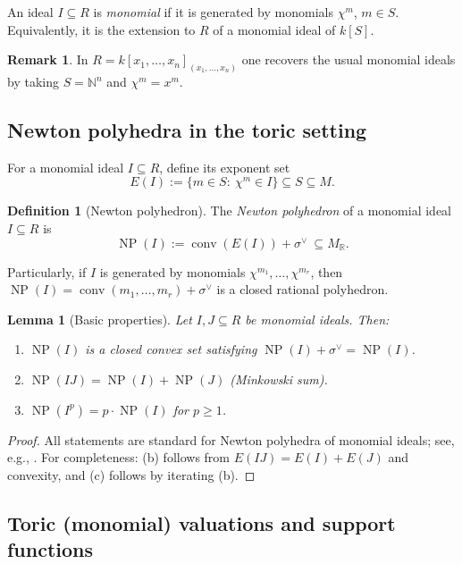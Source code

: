 \documentclass[12pt]{amsart}
\newcommand{\kk}{k}
\newcommand{\NN}{\mathbb{N}}
\newcommand{\RR}{\mathbb{R}}
\DeclareMathOperator{\conv}{conv}
\DeclareMathOperator{\NP}{NP}
\theoremstyle{plain}
\newtheorem{lemma}[theorem]{Lemma}
\theoremstyle{definition}
\newtheorem{definition}[theorem]{Definition}
\newtheorem{remark}[theorem]{Remark}
\numberwithin{equation}{section}
\begin{document}
An ideal $I\subseteq R$ is \emph{monomial} if it is generated by monomials $\chi^m$,
$m\in S$. Equivalently, it is the extension to $R$ of a monomial ideal of $\kk[S]$.


\begin{remark}
	In $R=\kk[x_1,\dots,x_n]_{(x_1,\dots,x_n)}$ one recovers the usual monomial ideals
	by taking $S=\NN^n$ and $\chi^m=x^m$.
\end{remark}

\subsection{Newton polyhedra in the toric setting}

For a monomial ideal $I\subseteq R$, define its exponent set
\[
E(I):=\{m\in S:\ \chi^m\in I\}\subseteq S\subseteq M.
\]

\begin{definition}[Newton polyhedron]\label{def:NP-toric}
	The \emph{Newton polyhedron} of a monomial ideal $I\subseteq R$ is
	\[
	\NP(I):=\conv(E(I))+\sigma^\vee\ \subseteq  M_\RR.
	\]
\end{definition}
Particularly, if $I$ is generated by monomials $\chi^{m_1}, \dots, \chi^{m_r}$, then $\NP(I) = \conv(m_1, \dots, m_r) + \sigma^\vee$ is a closed rational polyhedron.

\begin{lemma}[Basic properties] \label{lem:NP-basic}
	Let $I,J\subseteq R$ be monomial ideals. Then:
	\begin{enumerate}[label=(\alph*),leftmargin=2em]
		\item $\NP(I)$ is a closed convex set satisfying $\NP(I)+\sigma^\vee=\NP(I)$.
		\item $\NP(IJ)=\NP(I)+\NP(J)$ (Minkowski sum).
		\item $\NP(I^p)=p \cdot \NP(I)$ for $p\ge 1$.
	\end{enumerate}
\end{lemma}

\begin{proof}
	All statements are standard for Newton polyhedra of monomial ideals; see, e.g., \cite{Sturmfels,TeissierNP}.
	For completeness: (b) follows from $E(IJ)=E(I)+E(J)$ and convexity, and (c) follows by iterating (b).
\end{proof}

\subsection{Toric (monomial) valuations and support functions}
\end{document}
